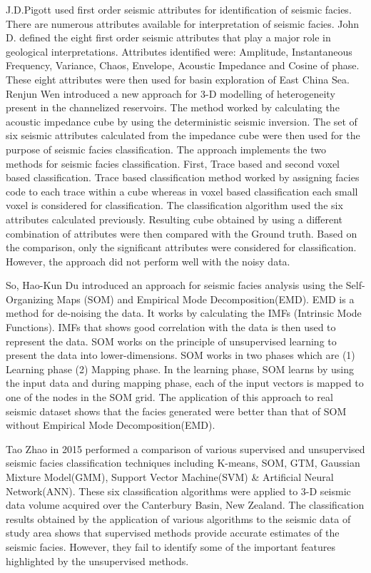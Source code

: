 \documentclass[a4paper]{article}
\begin{document}
J.D.Pigott\cite{john} used first order seismic attributes for identification of seismic facies. There are numerous attributes available for interpretation of seismic facies. John D.\cite{john} defined the eight first order seismic attributes that play a major role in geological interpretations. Attributes identified were: Amplitude, Instantaneous Frequency, Variance, Chaos, Envelope, Acoustic Impedance and Cosine of phase. These eight attributes were then used for basin exploration of East China Sea.
Renjun Wen\cite{renjun} introduced a new approach for 3-D modelling of heterogeneity present in the channelized reservoirs. The method worked by calculating the acoustic impedance cube by using the deterministic seismic inversion. The set of six seismic attributes calculated from the impedance cube were then used for the purpose of seismic facies classification. The approach implements the two methods for seismic facies classification. First, Trace based and second voxel based classification. Trace based classification method worked by assigning facies code to each trace within a cube whereas in voxel based classification each small voxel is considered for classification. The classification algorithm used the six attributes calculated previously. Resulting cube obtained by using a different combination of attributes were then compared with the Ground truth. Based on the comparison, only the significant attributes were considered for classification. However, the approach did not perform well with the noisy data.\smallbreak

So, Hao-Kun Du\cite{hao} introduced an approach for seismic facies analysis using the Self-Organizing Maps (SOM) and Empirical Mode Decomposition(EMD). EMD is a method for de-noising the data. It works by calculating the IMFs (Intrinsic Mode Functions). IMFs that shows good correlation with the data is then used to represent the data. SOM works on the principle of unsupervised learning to present the data into lower-dimensions. SOM\cite{som} works in two phases which are
(1) Learning phase
(2) Mapping phase.
In the learning phase, SOM learns by using the input data and during mapping phase, each of the input vectors is mapped to one of the nodes in the SOM grid. 
The application of this approach to real seismic dataset shows that the facies generated were better than that of SOM without Empirical Mode Decomposition(EMD).\smallbreak

Tao Zhao in 2015\cite{last} performed a comparison of various supervised and unsupervised seismic facies classification techniques including K-means, SOM, GTM, Gaussian Mixture Model(GMM), Support Vector Machine(SVM) \& Artificial Neural Network(ANN). These six classification algorithms were applied to 3-D seismic data volume acquired over the Canterbury Basin, New Zealand. The classification results obtained by the application of various algorithms to the seismic data of study area shows that supervised methods provide accurate estimates of the seismic facies. However, they fail to identify some of the important features highlighted by the unsupervised methods.\smallbreak 
\end{document}
